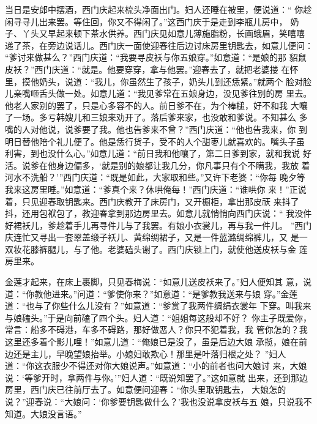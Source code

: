 当日是安郎中摆酒，西门庆起来梳头净面出门。妇人还睡在被里，便说道：“
你趁闲寻寻儿出来罢。等住回，你又不得闲了。”这西门庆于是走到李瓶儿房中，
奶子、丫头又早起来顿下茶水供养。西门庆见如意儿薄施脂粉，长画蛾眉，笑嘻嘻
递了茶，在旁边说话儿。西门庆一面使迎春往后边讨床房里钥匙去，如意儿便问：
“爹讨来做甚么？”西门庆道：“我要寻皮袄与你五娘穿。”如意道：“是娘的那
貂鼠皮袄？”西门庆道：“就是。他要穿穿，拿与他罢。”迎春去了，就把老婆搂
在怀里，摸他奶头，说道：“我儿，你虽然生了孩子，奶头儿到还恁紧。”就两个
脸对脸儿亲嘴咂舌头做一处。如意儿道：“我见爹常在五娘身边，没见爹往别的房
里去。他老人家别的罢了，只是心多容不的人。前日爹不在，为个棒槌，好不和我
大嚷了一场。多亏韩嫂儿和三娘来劝开了。落后爹来家，也没敢和爹说。不知甚么
多嘴的人对他说，说爹要了我。他也告爹来不曾？”西门庆道：“他也告我来，你
到明日替他陪个礼儿便了。他是恁行货子，受不的人个甜枣儿就喜欢的。嘴头子虽
利害，到也没什么心。”如意儿道：“前日我和他嚷了，第二日爹到家，就和我说
好活。说爹在他身边偏多，‘就是别的娘都让我几分，你凡事只有个不瞒我，我放
着河水不洗船？’”西门庆道：“既是如此，大家取和些。”又许下老婆：“你每
晚夕等我来这房里睡。”如意道：“爹真个来？休哄俺每！”西门庆道：“谁哄你
来！”正说着，只见迎春取钥匙来。西门庆教开了床房门，又开橱柜，拿出那皮祆
来抖了抖，还用包袱包了，教迎春拿到那边房里去。如意儿就悄悄向西门庆说：“
我没件好裙袄儿，爹趁着手儿再寻件儿与了我罢。有娘小衣裳儿，再与我一件儿。
”西门庆连忙又寻出一套翠盖缎子袄儿、黄绵绸裙子，又是一件蓝潞绸绵裤儿，又
是一双妆花膝裤腿儿，与了他。老婆磕头谢了。西门庆锁上门，就使他送皮袄与金
莲房里来。

金莲才起来，在床上裹脚，只见春梅说：“如意儿送皮袄来了。”妇人便知其
意，说道：“你教他进来。”问道：“爹使你来？”如意道：“是爹教我送来与娘
穿。”金莲道：“也与了你些什么儿没有？”如意道：“爹赏了我两件绸绢衣裳年
下穿。叫我来与娘磕头。”于是向前磕了四个头。妇人道：“姐姐每这般却不好？
你主子既爱你，常言：船多不碍港，车多不碍路，那好做恶人？你只不犯着我，我
管你怎的？我这里还多着个影儿哩！”如意儿道：“俺娘已是没了，虽是后边大娘
承揽，娘在前边还是主儿，早晚望娘抬举。小媳妇敢欺心！那里是叶落归根之处？
”妇人道：“你这衣服少不得还对你大娘说声。”如意道：“小的前者也问大娘讨
来，大娘说：‘等爹开时，拿两件与你。’”妇人道：“既说知罢了。”这如意就
出来，还到那边房里，西门庆已往前厅去了。如意便问迎春：“你头里取钥匙去，
大娘怎的说？”迎春说：“大娘问：‘你爹要钥匙做什么？’我也没说拿皮袄与五
娘，只说我不知道。大娘没言语。”

